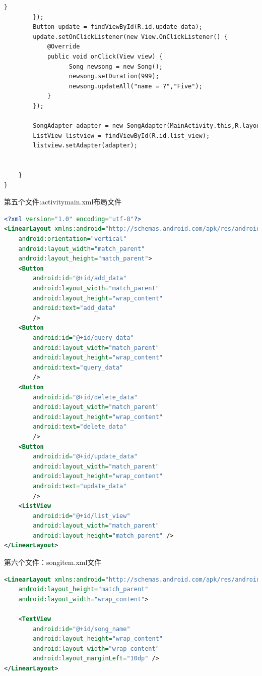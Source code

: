\documentclass[cs4size,a4paper]{ctexart}
\numberwithin{equation}{section}
\numberwithin{table}{section}
\numberwithin{figure}{section}
\begin{document}
\begin{lstlisting}[language=xml]
            }
        });
        Button update = findViewById(R.id.update_data);
        update.setOnClickListener(new View.OnClickListener() {
            @Override
            public void onClick(View view) {
                  Song newsong = new Song();
                  newsong.setDuration(999);
                  newsong.updateAll("name = ?","Five");
            }
        });

        SongAdapter adapter = new SongAdapter(MainActivity.this,R.layout.song_item,SongList);
        ListView listview = findViewById(R.id.list_view);
        listview.setAdapter(adapter);


    }
}
\end{lstlisting}

第五个文件:activitymain.xml布局文件
\begin{lstlisting}[language=xml]
<?xml version="1.0" encoding="utf-8"?>
<LinearLayout xmlns:android="http://schemas.android.com/apk/res/android"
    android:orientation="vertical"
    android:layout_width="match_parent"
    android:layout_height="match_parent">
    <Button
        android:id="@+id/add_data"
        android:layout_width="match_parent"
        android:layout_height="wrap_content"
        android:text="add_data"
        />
    <Button
        android:id="@+id/query_data"
        android:layout_width="match_parent"
        android:layout_height="wrap_content"
        android:text="query_data"
        />
    <Button
        android:id="@+id/delete_data"
        android:layout_width="match_parent"
        android:layout_height="wrap_content"
        android:text="delete_data"
        />
    <Button
        android:id="@+id/update_data"
        android:layout_width="match_parent"
        android:layout_height="wrap_content"
        android:text="update_data"
        />
    <ListView
        android:id="@+id/list_view"
        android:layout_width="match_parent"
        android:layout_height="match_parent" />
</LinearLayout>
\end{lstlisting}

第六个文件：songitem.xml文件
\begin{lstlisting}[language=xml]
<LinearLayout xmlns:android="http://schemas.android.com/apk/res/android"
    android:layout_height="match_parent"
    android:layout_width="wrap_content">

    <TextView
        android:id="@+id/song_name"
        android:layout_height="wrap_content"
        android:layout_width="wrap_content"
        android:layout_marginLeft="10dp" />
</LinearLayout>
\end{lstlisting}
\end{document}

